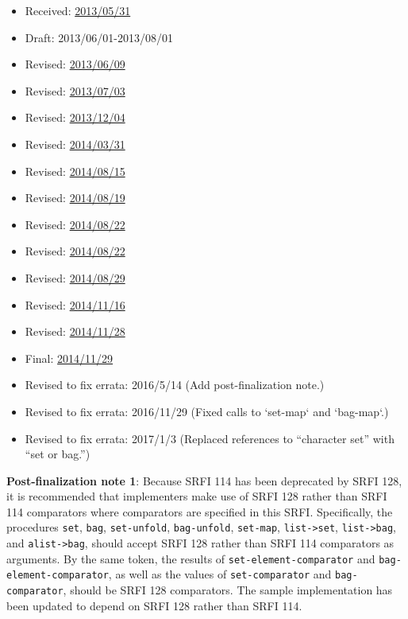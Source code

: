 \begin{itemize}
\tightlist
\item
  Received:
  \href{http://srfi.schemers.org/srfi-113/srfi-113-1.1.html}{2013/05/31}
\item
  Draft: 2013/06/01-2013/08/01
\item
  Revised:
  \href{http://srfi.schemers.org/srfi-113/srfi-113-1.2.html}{2013/06/09}
\item
  Revised:
  \href{http://srfi.schemers.org/srfi-113/srfi-113-1.3.html}{2013/07/03}
\item
  Revised:
  \href{http://srfi.schemers.org/srfi-113/srfi-113-1.4.html}{2013/12/04}
\item
  Revised:
  \href{http://srfi.schemers.org/srfi-113/srfi-113-1.5.html}{2014/03/31}
\item
  Revised:
  \href{http://srfi.schemers.org/srfi-113/srfi-113-1.6.html}{2014/08/15}
\item
  Revised:
  \href{http://srfi.schemers.org/srfi-113/srfi-113-1.8.html}{2014/08/19}
\item
  Revised:
  \href{http://srfi.schemers.org/srfi-113/srfi-113-1.9.html}{2014/08/22}
\item
  Revised:
  \href{http://srfi.schemers.org/srfi-113/srfi-113-1.10.html}{2014/08/22}
\item
  Revised:
  \href{http://srfi.schemers.org/srfi-113/srfi-113-1.11.html}{2014/08/29}
\item
  Revised:
  \href{http://srfi.schemers.org/srfi-113/srfi-113-1.12.html}{2014/11/16}
\item
  Revised:
  \href{http://srfi.schemers.org/srfi-113/srfi-113-1.13.html}{2014/11/28}
\item
  Final:
  \href{http://srfi.schemers.org/srfi-113/srfi-113-1.14.html}{2014/11/29}
\item
  Revised to fix errata: 2016/5/14 (Add post-finalization note.)
\item
  Revised to fix errata: 2016/11/29 (Fixed calls to `set-map` and
  `bag-map`.)
\item
  Revised to fix errata: 2017/1/3 (Replaced references to ``character
  set'' with ``set or bag.'')
\end{itemize}

\textbf{Post-finalization note 1}: Because SRFI 114 has been deprecated
by SRFI 128, it is recommended that implementers make use of SRFI 128
rather than SRFI 114 comparators where comparators are specified in this
SRFI. Specifically, the procedures \texttt{set}, \texttt{bag},
\texttt{set-unfold}, \texttt{bag-unfold}, \texttt{set-map},
\texttt{list-\textgreater{}set}, \texttt{list-\textgreater{}bag}, and
\texttt{alist-\textgreater{}bag}, should accept SRFI 128 rather than
SRFI 114 comparators as arguments. By the same token, the results of
\texttt{set-element-comparator} and \texttt{bag-element-comparator}, as
well as the values of \texttt{set-comparator} and
\texttt{bag-comparator}, should be SRFI 128 comparators. The sample
implementation has been updated to depend on SRFI 128 rather than SRFI
114.

